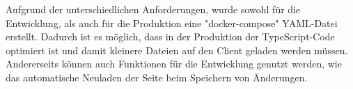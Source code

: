 
Aufgrund der unterschiedlichen Anforderungen, wurde sowohl für die Entwicklung, als auch für die Produktion eine "docker-compose" YAML-Datei erstellt. 
Dadurch ist es möglich, dass in der Produktion der TypeScript-Code optimiert ist und damit kleinere Dateien auf den Client geladen werden müssen. 
Andererseits können auch Funktionen für die Entwicklung genutzt werden, wie das automatische Neuladen der Seite beim Speichern von Änderungen.



